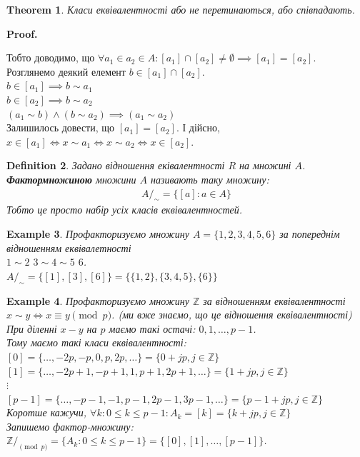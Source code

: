 \documentclass[a4paper, 14pt]{extarticle}
\makeatletter
\theoremstyle{theoremdd}
\newtheorem{theorem}{Theorem}[subsection]
\theoremstyle{theoremdd}
\newtheorem{definition}[theorem]{Definition}
\theoremstyle{theoremdd}
\theoremstyle{theoremdd}
\theoremstyle{theoremdd}
\newtheorem{example}[theorem]{Example}
\theoremstyle{theoremdd}
\theoremstyle{theoremdd}
\theoremstyle{theoremdd}
\theoremstyle{theoremdd}
\theoremstyle{theoremdd}
\theoremstyle{theoremdd}
\theoremstyle{theoremdd}
\theoremstyle{theoremdd}
\theoremstyle{theoremdd}
\theoremstyle{theoremdd}
\renewenvironment{proof}[1][Proof.\\]{\par
\pushQED{\hfill \qed}%
\normalfont \topsep6\p@\@plus6\p@\relax
\trivlist
\item\relax
{\bfseries
#1\@addpunct{.}}\hspace\labelsep\ignorespaces
}{%
\popQED\endtrivlist\@endpefalse
}
\makeatother
\begin{document}
\begin{theorem}
Класи еквівалентності або не перетинаються, або співпадають.
\end{theorem}

\begin{proof}
Тобто доводимо, що $\forall a_1 \in a_2 \in A: [a_1] \cap [a_2] \neq \emptyset \implies [a_1] = [a_2]$.\\
Розглянемо деякий елемент $b \in [a_1] \cap [a_2]$.\\
$b \in [a_1] \implies b \sim a_1$\\
$b \in [a_2] \implies b \sim a_2$\\
$(a_1 \sim b) \wedge (b \sim a_2) \implies (a_1 \sim a_2)$\\
Залишилось довести, що $[a_1] = [a_2]$. І дійсно,\\
$x \in [a_1] \iff x \sim a_1 \iff x \sim a_2 \iff x \in [a_2]$.
\end{proof}

\begin{definition}
Задано відношення еківалентності $R$ на множині $A$. \\
\textbf{Фактормножиною} множини $A$ називають таку множину:
\begin{align*}
A/_{\sim} = \{[a]: a \in A\}
\end{align*}
Тобто це просто набір усіх класів еквівалентностей.
\end{definition}

\begin{example}
Профакторизуємо множину $A = \{1,2,3,4,5,6\}$ за попереднім відношенням еквівалетності\\
$1 \sim 2$ \hspace{0.5cm} $3 \sim 4 \sim 5$ \hspace{0.5cm} $6$.\\
$A/_{\sim} = \{[1],[3],[6]\} = \{\{1,2\}, \{3,4,5\}, \{6 \} \}$
\end{example}

\begin{example}
Профакторизуємо множину $\mathbb{Z}$ за відношенням еквівалентності $x \sim y \iff x \equiv y \pmod p$. (ми вже знаємо, що це відношення еквівалентності)\\
При діленні $x-y$ на $p$ маємо такі остачі: $0,1,\dots,p-1$.\\
Тому маємо такі класи еквівалентності:\\
$[0] = \{\dots, -2p, -p, 0, p, 2p, \dots\} = \{0 + jp, j \in \mathbb{Z}\}$\\
$[1] = \{\dots, -2p+1, -p+1, 1, p+1, 2p+1, \dots\} = \{1 + jp, j \in \mathbb{Z}\}$\\
$\vdots$\\
$[p-1] = \{\dots, -p-1, -1, p-1, 2p-1, 3p-1, \dots\} = \{p-1 + jp, j \in \mathbb{Z}\}$\\
Коротше кажучи, $\forall k: 0 \leq k \leq p-1: A_k = [k] = \{k+jp, j \in \mathbb{Z}\}$\\
Запишемо фактор-множину:\\
$\mathbb{Z}/_{\!\pmod p} = \{A_k: 0 \leq k \leq p-1\} = \{[0],[1],\dots,[p-1] \}$.
\end{example}
\end{document}
